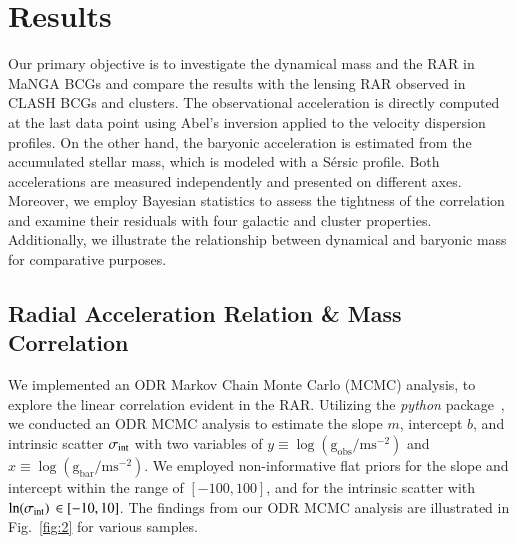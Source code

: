 \documentclass[a4paper, two-column, twocolappendix]{aa}
\newcommand{\gbar}{\mathrm{g}_\mathrm{bar}}
\newcommand{\gobs}{\mathrm{g}_\mathrm{obs}}
\begin{document}
%
%

\section{Results}\label{sec:Results}

Our primary objective is to investigate the dynamical mass and the RAR in MaNGA BCGs and compare the results with the lensing RAR observed in CLASH BCGs and clusters. 
The observational acceleration is directly computed at the last data point using Abel's inversion applied to the velocity dispersion profiles. 
On the other hand, the baryonic acceleration is estimated from the accumulated stellar mass, which is modeled with a S{\'e}rsic profile.
Both accelerations are measured independently and presented on different axes. 
Moreover, we employ Bayesian statistics to assess the tightness of the correlation and examine their residuals with four galactic and cluster properties. 
Additionally, we illustrate the relationship between dynamical and baryonic mass for comparative purposes.


\subsection{Radial Acceleration Relation \& Mass Correlation}

We implemented an ODR Markov Chain Monte Carlo (MCMC) analysis, to explore the linear correlation evident in the RAR. 
Utilizing the \textit{python} package~\citep[emcee;][]{corner, emcee19}, we conducted an ODR MCMC analysis 
 to estimate the slope $m$, intercept $b$, and intrinsic scatter $\sigma_{\rm int}$
 with two variables of $y\equiv\log(\gobs/\mathrm{ms}^{-2})$ and $x\equiv\log(\gbar/\mathrm{ms}^{-2})$. 
We employed non-informative flat priors for the slope and intercept within the range of $[-100, 100]$, and for the intrinsic scatter with $\ln(\sigma_{\rm int})\,\in[-10,10]$. 
The findings from our ODR MCMC analysis are illustrated in Fig.~\ref{fig:2} for various samples.
\end{document}
